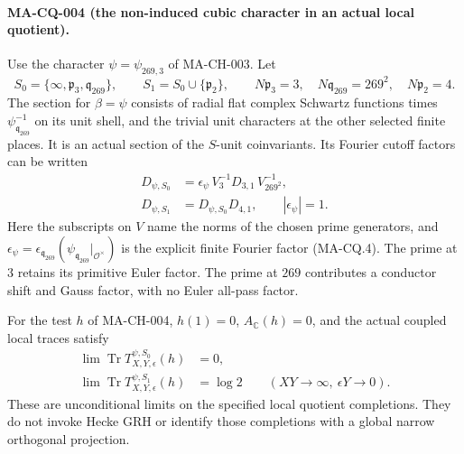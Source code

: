 \paragraph{MA-CQ-004 (the non-induced cubic character in an actual local quotient).}
Use the character $\psi=\psi_{269,3}$ of MA-CH-003.
Let
\[
 S_0=\{\infty,\mathfrak p_3,\mathfrak q_{269}\},
 \qquad S_1=S_0\cup\{\mathfrak p_2\},
 \qquad
 N\mathfrak p_3=3,\quad N\mathfrak q_{269}=269^2,\quad
 N\mathfrak p_2=4 .
\tag{MA-CQ.35}
\]
The section for $\beta=\psi$ consists of radial flat
complex Schwartz functions times
$\psi_{\mathfrak q_{269}}^{-1}$
on its unit shell, and the trivial unit characters
at the other selected finite places.
It is an actual section of the $S$-unit coinvariants.
Its Fourier cutoff factors can be written
\[
\begin{aligned}
 D_{\psi,S_0}
   &=\epsilon_\psi\,
       V_3^{-1}D_{3,1}\,V_{269^2}^{-1},\\
 D_{\psi,S_1}
   &=D_{\psi,S_0}D_{4,1},\qquad |\epsilon_\psi|=1 .
\end{aligned}
\tag{MA-CQ.36}
\]
Here the subscripts on $V$ name the norms of the
chosen prime generators, and
$\epsilon_\psi=\epsilon_{\mathfrak q_{269}}
       (\psi_{\mathfrak q_{269}}|_{\mathcal O^\times})$
is the explicit finite Fourier factor (MA-CQ.4).
The prime at $3$ retains its primitive Euler factor.
The prime at $269$ contributes a conductor shift
and Gauss factor, with no Euler all-pass factor.

For the test $h$ of MA-CH-004,
$h(1)=0$, $A_{\mathbb C}(h)=0$, and the actual
coupled local traces satisfy
\[
\begin{aligned}
 \lim\operatorname{Tr}T^{\psi,S_0}_{X,Y,\epsilon}(h)&=0,\\
 \lim\operatorname{Tr}T^{\psi,S_1}_{X,Y,\epsilon}(h)&=\log2
                   \qquad(XY\to\infty,\ \epsilon Y\to0).
\end{aligned}
\tag{MA-CQ.37}
\]
These are unconditional limits on the specified
local quotient completions.  They do not invoke
Hecke GRH or identify those completions with a
global narrow orthogonal projection.

